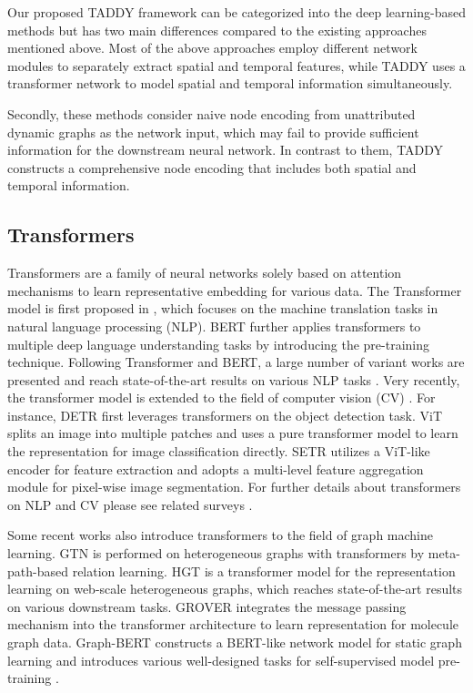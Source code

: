 \documentclass[10pt,journal,compsoc]{IEEEtran}
\newcommand{\yg}{}
\begin{document}
Our proposed TADDY framework can be categorized into the deep learning-based methods but has two main differences compared to the \yg{existing} approaches mentioned above. 
\yg{Most of} the above approaches employ different network modules to separately extract spatial and temporal features, while TADDY uses a transformer network to model spatial and temporal information simultaneously.

Secondly, these methods consider naive node encoding from unattributed dynamic graphs as the network input, which may fail to provide sufficient information for the downstream neural network. 
In contrast to them, TADDY constructs a comprehensive node encoding that includes both spatial and temporal information.


\subsection{Transformers} \label{subsec:rw_transformer}

Transformers are a family of neural networks solely based on attention mechanisms to learn representative embedding for various data. 
The Transformer model is first proposed in \cite{vaswani2017attention}, which focuses on the machine translation tasks in natural language processing (NLP). 
BERT \cite{devlin2018bert} further applies transformers to multiple deep language understanding tasks by introducing the pre-training technique. 
Following Transformer and BERT, a large number of variant works are presented and reach state-of-the-art results on various NLP tasks \cite{lan2019albert,liu2019roberta,yang2019xlnet}.
Very recently, the transformer model is extended to the field of computer vision (CV) \cite{liu2021a}. 
For instance, DETR \cite{carion2020end} first leverages transformers on the object detection task. 
ViT \cite{dosovitskiy2021an} splits an image into multiple patches and uses a pure transformer model to learn the representation for image classification directly. 
SETR \cite{zheng2020rethinking} utilizes a ViT-like encoder for feature extraction and adopts a multi-level feature aggregation module for pixel-wise image segmentation. 
For further details about transformers on NLP and CV please see related surveys \cite{han2020survey,tay2020efficient}.

Some recent works also introduce transformers to the field of graph machine learning. 
GTN \cite{yun2019graph} is performed on heterogeneous graphs with transformers by meta-path-based relation learning. 
HGT \cite{hu2020heterogeneous} is a transformer model for the representation learning on \yg{web-scale} heterogeneous graphs, which reaches state-of-the-art results on various downstream tasks. 
GROVER \cite{rong2020self} integrates the message passing mechanism into the transformer architecture to learn representation for molecule graph data. 
Graph-BERT \cite{zhang2020graph} constructs a BERT-like network model for static graph learning and introduces various well-designed tasks for self-supervised model pre-training \cite{liu2021graph}.
\end{document}
